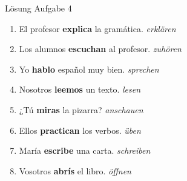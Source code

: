 \documentclass[aspectratio=169, 11pt]{beamer}
\newcommand{\de}[1]{\textit{\textcolor{mittelgrau}{#1}}}
\begin{document}
\begin{frame}{Lösung Aufgabe 4}
    \vspace{0.2cm}

    {\small
    \begin{enumerate}[label=\alph*)]
        \setlength{\itemsep}{0.3cm}
        \item El profesor \textcolor{richtig}{\textbf{explica}} la gramática. \de{erklären}
        \item Los alumnos \textcolor{richtig}{\textbf{escuchan}} al profesor. \de{zuhören}
        \item Yo \textcolor{richtig}{\textbf{hablo}} español muy bien. \de{sprechen}
        \item Nosotros \textcolor{richtig}{\textbf{leemos}} un texto. \de{lesen}
        \item ¿Tú \textcolor{richtig}{\textbf{miras}} la pizarra? \de{anschauen}
        \item Ellos \textcolor{richtig}{\textbf{practican}} los verbos. \de{üben}
        \item María \textcolor{richtig}{\textbf{escribe}} una carta. \de{schreiben}
        \item Vosotros \textcolor{richtig}{\textbf{abrís}} el libro. \de{öffnen}
    \end{enumerate}}
\end{frame}

\end{document}
